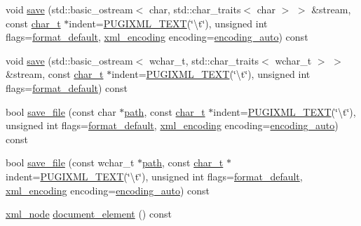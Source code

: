 \begin{DoxyCompactItemize}
\item 
void \hyperlink{classpugi_1_1xml__document_a471d7354af62da143f10943057c99ffa}{save} (std\-::basic\-\_\-ostream$<$ char, std\-::char\-\_\-traits$<$ char $>$ $>$ \&stream, const \hyperlink{namespacepugi_aef5a7a62cba0507542220ea15afe39df}{char\-\_\-t} $\ast$indent=\hyperlink{pugixml_8hpp_ad5475bca2e336810ae5906349e644d0b}{P\-U\-G\-I\-X\-M\-L\-\_\-\-T\-E\-X\-T}(\char`\"{}\textbackslash{}t\char`\"{}), unsigned int flags=\hyperlink{namespacepugi_a325f48a35abbaeacdfd8b7fc9ed1713c}{format\-\_\-default}, \hyperlink{namespacepugi_a03f708f86abeff5fce6842ffd6a0951e}{xml\-\_\-encoding} encoding=\hyperlink{namespacepugi_a03f708f86abeff5fce6842ffd6a0951eae11b2ef666f03e77b7e764e38d22dc17}{encoding\-\_\-auto}) const 
\item 
void \hyperlink{classpugi_1_1xml__document_ae0b377bda28c7fbac4ba50b4e3f9d211}{save} (std\-::basic\-\_\-ostream$<$ wchar\-\_\-t, std\-::char\-\_\-traits$<$ wchar\-\_\-t $>$ $>$ \&stream, const \hyperlink{namespacepugi_aef5a7a62cba0507542220ea15afe39df}{char\-\_\-t} $\ast$indent=\hyperlink{pugixml_8hpp_ad5475bca2e336810ae5906349e644d0b}{P\-U\-G\-I\-X\-M\-L\-\_\-\-T\-E\-X\-T}(\char`\"{}\textbackslash{}t\char`\"{}), unsigned int flags=\hyperlink{namespacepugi_a325f48a35abbaeacdfd8b7fc9ed1713c}{format\-\_\-default}) const 
\item 
bool \hyperlink{classpugi_1_1xml__document_ac67294573cbaa41d3e6210480a9f7f99}{save\-\_\-file} (const char $\ast$\hyperlink{classpugi_1_1xml__node_ae5694be88058346ad8e6e418410d4979}{path}, const \hyperlink{namespacepugi_aef5a7a62cba0507542220ea15afe39df}{char\-\_\-t} $\ast$indent=\hyperlink{pugixml_8hpp_ad5475bca2e336810ae5906349e644d0b}{P\-U\-G\-I\-X\-M\-L\-\_\-\-T\-E\-X\-T}(\char`\"{}\textbackslash{}t\char`\"{}), unsigned int flags=\hyperlink{namespacepugi_a325f48a35abbaeacdfd8b7fc9ed1713c}{format\-\_\-default}, \hyperlink{namespacepugi_a03f708f86abeff5fce6842ffd6a0951e}{xml\-\_\-encoding} encoding=\hyperlink{namespacepugi_a03f708f86abeff5fce6842ffd6a0951eae11b2ef666f03e77b7e764e38d22dc17}{encoding\-\_\-auto}) const 
\item 
bool \hyperlink{classpugi_1_1xml__document_a47e18cd3438eabd64fa2f82d56b08aef}{save\-\_\-file} (const wchar\-\_\-t $\ast$\hyperlink{classpugi_1_1xml__node_ae5694be88058346ad8e6e418410d4979}{path}, const \hyperlink{namespacepugi_aef5a7a62cba0507542220ea15afe39df}{char\-\_\-t} $\ast$indent=\hyperlink{pugixml_8hpp_ad5475bca2e336810ae5906349e644d0b}{P\-U\-G\-I\-X\-M\-L\-\_\-\-T\-E\-X\-T}(\char`\"{}\textbackslash{}t\char`\"{}), unsigned int flags=\hyperlink{namespacepugi_a325f48a35abbaeacdfd8b7fc9ed1713c}{format\-\_\-default}, \hyperlink{namespacepugi_a03f708f86abeff5fce6842ffd6a0951e}{xml\-\_\-encoding} encoding=\hyperlink{namespacepugi_a03f708f86abeff5fce6842ffd6a0951eae11b2ef666f03e77b7e764e38d22dc17}{encoding\-\_\-auto}) const 
\item 
\hyperlink{classpugi_1_1xml__node}{xml\-\_\-node} \hyperlink{classpugi_1_1xml__document_aa3b17a8891e2c89996ab4c7a2a6759ad}{document\-\_\-element} () const 
\end{DoxyCompactItemize}
